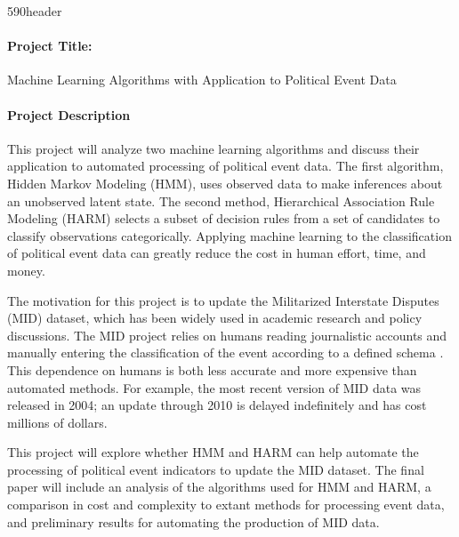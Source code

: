 \documentclass[12pt,letterpaper]{article}
\begin{document}
\cps590header

\paragraph{Project Title:} Machine Learning Algorithms with Application to Political Event Data

\paragraph{Project Description} This project will analyze two machine learning algorithms and discuss their application to automated processing of political event data. The first algorithm, Hidden Markov Modeling (HMM), uses observed data to make inferences about an unobserved latent state. The second method, Hierarchical Association Rule Modeling (HARM) selects a subset of decision rules from a set of candidates to classify observations categorically. Applying machine learning to the classification of political event data can greatly reduce the cost in human effort, time, and money. 

The motivation for this project is to update the Militarized Interstate Disputes (MID) dataset, which has been widely used in academic research and policy discussions. The MID project relies on humans reading journalistic accounts and manually entering the classification of the event according to a defined schema \citep{gerner1994, grimmer2013}. This dependence on humans is both less accurate \citep{king2003automated, mikhaylov2012coder, ruggeri2011events} and more expensive than automated methods. For example, the most recent version of MID data was released in 2004; an update through 2010 is delayed indefinitely and has cost millions of dollars.

This project will explore whether HMM and HARM can help automate the processing of political event indicators to update the MID dataset. The final paper will include an analysis of the algorithms used for HMM and HARM, a comparison in cost and complexity to extant methods for processing event data, and preliminary results for automating the production of MID data.



\renewcommand{\bibsection}{\paragraph{References}}
\setlength{\bibsep}{0.0pt}


\end{document}
